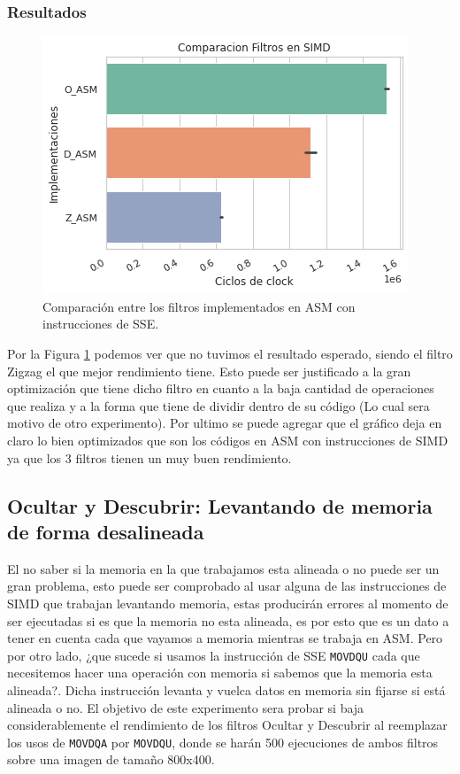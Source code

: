 \documentclass[a4paper]{article}
\begin{document}
\subsubsection{Resultados}

 \begin{figure}[h!]
   \begin{center}
 	\includegraphics[scale=0.6]{graphs/filtro-comparativo-asm.png}
 	\caption{Comparación entre los filtros implementados en ASM con instrucciones de SSE.}
 	\label{fig:expz-comparativo-asm}
   \end{center}
\end{figure}


Por la Figura \ref{fig:expz-comparativo-asm} podemos ver que no tuvimos el resultado esperado, siendo el filtro Zigzag el que mejor rendimiento tiene. Esto puede ser justificado a la gran optimización que tiene dicho filtro en cuanto a la baja cantidad de operaciones que realiza y a la forma que tiene de dividir dentro de su código (Lo cual sera motivo de otro experimento). Por ultimo se puede agregar que el gráfico deja en claro lo bien optimizados que son los códigos en ASM con instrucciones de SIMD ya que los 3 filtros tienen un muy buen rendimiento.

\newpage

\subsection{Ocultar y Descubrir: Levantando de memoria de forma desalineada}
El no saber si la memoria en la que trabajamos esta alineada o no puede ser un gran problema, esto puede ser comprobado al usar alguna de las instrucciones de SIMD que trabajan levantando memoria, estas producirán errores al momento de ser ejecutadas si es que la memoria no esta alineada, es por esto que es un dato a tener en cuenta cada que vayamos a memoria mientras se trabaja en ASM. Pero por otro lado, ¿que sucede si usamos la instrucción de SSE \texttt{MOVDQU} cada que necesitemos hacer una operación con memoria si sabemos que la memoria esta alineada?. Dicha instrucción levanta y vuelca datos en memoria sin fijarse si está alineada o no. El objetivo de este experimento sera probar si baja considerablemente el rendimiento de los filtros Ocultar y Descubrir al reemplazar los usos de \texttt{MOVDQA} por \texttt{MOVDQU}, donde se harán 500 ejecuciones de ambos filtros sobre una imagen de tamaño 800x400.
\end{document}
